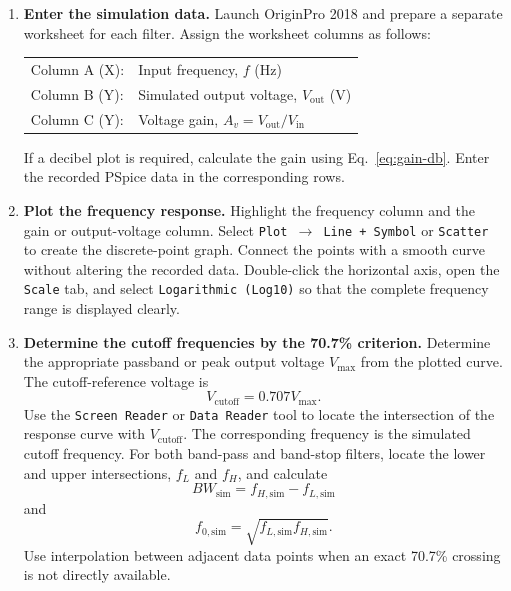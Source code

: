 \documentclass[12pt,a4paper]{article}
\begin{document}
\begin{enumerate}[leftmargin=0.8cm,label=\textbf{Step \arabic*:},itemsep=0.55em]
  \item \textbf{Enter the simulation data.}
  Launch OriginPro 2018 and prepare a separate worksheet for each filter. Assign the worksheet columns as follows:
  \begin{center}
    \begin{tabular}{@{}ll@{}}
      Column A (X): & Input frequency, $f$ ($\mathrm{Hz}$) \\
      Column B (Y): & Simulated output voltage, $V_{\mathrm{out}}$ ($\mathrm{V}$) \\
      Column C (Y): & Voltage gain, $A_v=V_{\mathrm{out}}/V_{\mathrm{in}}$
    \end{tabular}
  \end{center}
  If a decibel plot is required, calculate the gain using Eq.~\eqref{eq:gain-db}. Enter the recorded PSpice data in the corresponding rows.

  \item \textbf{Plot the frequency response.}
  Highlight the frequency column and the gain or output-voltage column. Select \texttt{Plot $\rightarrow$ Line + Symbol} or \texttt{Scatter} to create the discrete-point graph. Connect the points with a smooth curve without altering the recorded data. Double-click the horizontal axis, open the \texttt{Scale} tab, and select \texttt{Logarithmic (Log10)} so that the complete frequency range is displayed clearly.

  \item \textbf{Determine the cutoff frequencies by the 70.7\% criterion.}
  Determine the appropriate passband or peak output voltage $V_{\max}$ from the plotted curve. The cutoff-reference voltage is
  \begin{equation}
    V_{\mathrm{cutoff}}=0.707V_{\max}.
    \label{eq:cutoff-reference-voltage}
  \end{equation}
  Use the \texttt{Screen Reader} or \texttt{Data Reader} tool to locate the intersection of the response curve with $V_{\mathrm{cutoff}}$. The corresponding frequency is the simulated cutoff frequency. For both band-pass and band-stop filters, locate the lower and upper intersections, $f_L$ and $f_H$, and calculate
  \begin{equation}
    BW_{\mathrm{sim}}=f_{H,\mathrm{sim}}-f_{L,\mathrm{sim}}
    \label{eq:simulated-bandwidth}
  \end{equation}
  and
  \begin{equation}
    f_{0,\mathrm{sim}}=\sqrt{f_{L,\mathrm{sim}}f_{H,\mathrm{sim}}}.
    \label{eq:simulated-center-frequency}
  \end{equation}
  Use interpolation between adjacent data points when an exact 70.7\% crossing is not directly available.


\end{enumerate}
\end{document}
